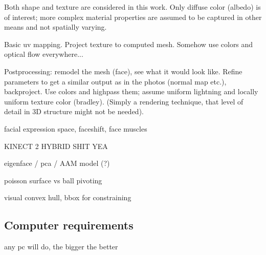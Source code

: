 Both shape and texture are considered in this work. Only diffuse color (albedo) is of interest; more complex material properties are assumed to be captured in other means and not spatially varying.

Basic uv mapping. Project texture to computed mesh. Somehow use colors and optical flow everywhere...

Postprocessing: remodel the mesh (face), see what it would look like. Refine parameters to get a similar output as in the photos (normal map etc.), backproject. Use colors and highpass them; assume uniform lightning and locally uniform texture color (bradley). (Simply a rendering technique, that level of detail in 3D structure might not be needed).

facial expression space, faceshift, face muscles

KINECT 2 HYBRID SHIT YEA

eigenface / pca / AAM model (?)

poisson surface vs ball pivoting

visual convex hull, bbox for constraining


\subsection{Computer requirements} %

any pc will do, the bigger the better


